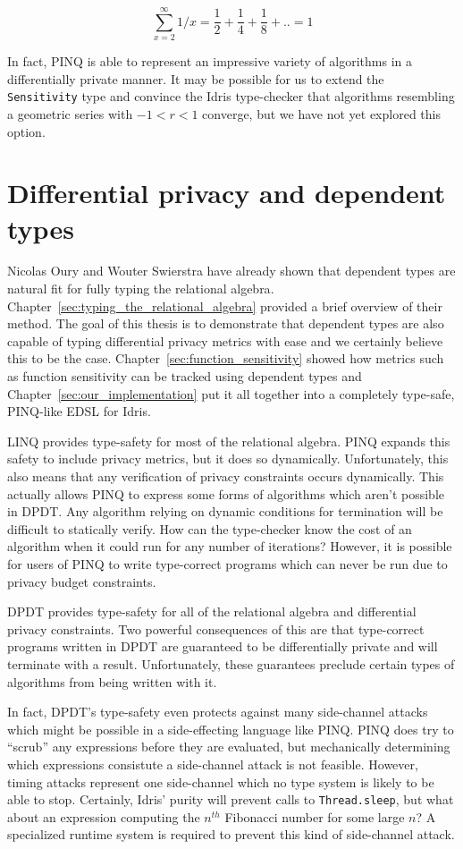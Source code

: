 \documentclass[12pt]{report}
\begin{document}
$$\sum_{x=2}^{\infty} 1/x = \frac{1}{2} + \frac{1}{4} + \frac{1}{8} + .. = 1$$

In fact, PINQ is able to represent an impressive variety of algorithms in a differentially private manner.
It may be possible for us to extend the \texttt{Sensitivity} type and convince the Idris type-checker that algorithms resembling a geometric series with $-1 < r < 1$ converge, but we have not yet explored this option.

\section{Differential privacy and dependent types}

Nicolas Oury and Wouter Swierstra have already shown that dependent types are natural fit for fully typing the relational algebra\cite{OurySwierstra08PowerOfPi}.
Chapter~\ref{sec:typing_the_relational_algebra} provided a brief overview of their method.
The goal of this thesis is to demonstrate that dependent types are also capable of typing differential privacy metrics with ease and we certainly believe this to be the case.
Chapter~\ref{sec:function_sensitivity} showed how metrics such as function sensitivity can be tracked using dependent types and Chapter~\ref{sec:our_implementation} put it all together into a completely type-safe, PINQ-like EDSL for Idris.

LINQ provides type-safety for most of the relational algebra.
PINQ expands this safety to include privacy metrics, but it does so dynamically.
Unfortunately, this also means that any verification of privacy constraints occurs dynamically.
This actually allows PINQ to express some forms of algorithms which aren't possible in DPDT.
Any algorithm relying on dynamic conditions for termination will be difficult to statically verify.
How can the type-checker know the cost of an algorithm when it could run for any number of iterations?
However, it is possible for users of PINQ to write type-correct programs which can never be run due to privacy budget constraints.

DPDT provides type-safety for all of the relational algebra and differential privacy constraints.
Two powerful consequences of this are that type-correct programs written in DPDT are guaranteed to be differentially private and will terminate with a result.
Unfortunately, these guarantees preclude certain types of algorithms from being written with it.

In fact, DPDT's type-safety even protects against many side-channel attacks which might be possible in a side-effecting language like PINQ.
PINQ does try to ``scrub'' any expressions before they are evaluated, but mechanically determining which expressions consistute a side-channel attack is not feasible.
However, timing attacks represent one side-channel which no type system is likely to be able to stop.
Certainly, Idris' purity will prevent calls to \texttt{Thread.sleep}, but what about an expression computing the $n^{th}$ Fibonacci number for some large $n$?
A specialized runtime system is required to prevent this kind of side-channel attack\cite{conf/uss/HaeberlenPN11}.
\end{document}
